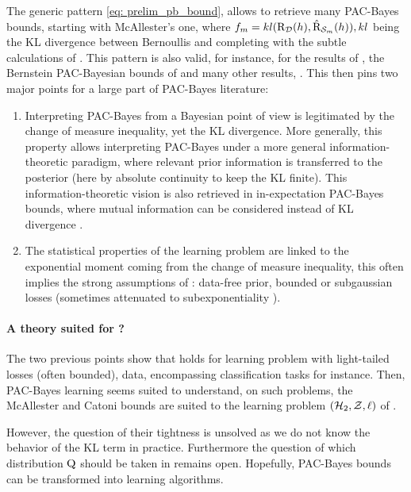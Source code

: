 The generic pattern \eqref{eq: prelim_pb_bound}, allows to retrieve many PAC-Bayes bounds, starting with McAllester's one, where $f_m= kl(\text{R}_{\mathcal{D}}(h),\hat{\text{R}}_{\mathcal{S}_m}(h)), kl$ being the KL divergence between Bernoullis and completing with the subtle calculations of \citet{maurer2004note}. This pattern is also valid, for instance, for the results of \citet{germain2009pac}, the Bernstein PAC-Bayesian bounds of \citet{tolstikhin2013pac,mhammedi2019pac} and many other results, \eg \citet{thiemann2017strongly,guedj2018pac,holland2019pac,wu2022split}. This then pins two major points for a large part of PAC-Bayes literature: 

\begin{enumerate}
  \item Interpreting PAC-Bayes from a Bayesian point of view is legitimated by the change of measure inequality, yet the KL divergence. More generally, this property allows interpreting PAC-Bayes under a more general information-theoretic paradigm, where relevant prior information is transferred to the posterior (here by absolute continuity to keep the KL finite). This information-theoretic vision is also retrieved in in-expectation PAC-Bayes bounds, where mutual information can be considered instead of KL divergence \citep{russo2016control,xu2017info,steinke2020reason,grunwald2021mac,hellstrom2020gene,hellstrom2022new}. 
  \item The statistical properties of the learning problem are linked to the exponential moment coming from the change of measure inequality, this often implies the strong assumptions of : data-free prior, bounded or subgaussian losses (sometimes attenuated to subexponentiality \citealp{catoni2004statistical}).
\end{enumerate}

\paragraph{A theory suited for ?}
The two previous points show that  holds for learning problem with light-tailed losses (often bounded), \iid data, encompassing classification tasks for instance. Then, PAC-Bayes learning seems suited to understand, on such problems, the McAllester and Catoni bounds are suited to the learning problem $(\mathcal{H}_2,\mathcal{Z},\ell)$ of . 

However, the question of their tightness is unsolved as we do not know the behavior of the KL term in practice. Furthermore the question of which distribution $\mathrm{Q}$ should be taken in  remains open. Hopefully, PAC-Bayes bounds can be transformed into learning algorithms.

